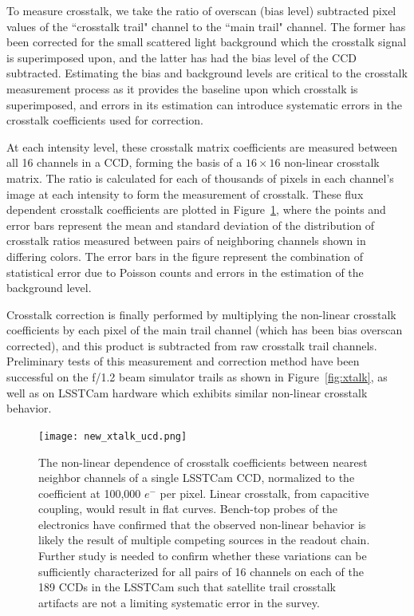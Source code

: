 \documentclass[twocolumn,trackchanges]{aastex63}
\begin{document}
To measure crosstalk, we take the ratio of overscan (bias level) subtracted pixel values of the ``crosstalk trail" channel to the ``main trail" channel. The former has been corrected for the small scattered light background which the crosstalk signal is superimposed upon, and the latter has had the bias level of the CCD subtracted. Estimating the bias and background levels are critical to the crosstalk measurement process as it provides the baseline upon which crosstalk is superimposed, and errors in its estimation can introduce systematic errors in the crosstalk coefficients used for correction.

At each intensity level, these crosstalk matrix coefficients are measured between all 16 channels in a CCD, forming the basis of a $16\times16$ non-linear crosstalk matrix. The ratio is calculated for each of thousands of pixels in each channel’s image at each intensity to form the measurement of crosstalk. These flux dependent crosstalk coefficients are plotted in Figure~\ref{fig:relxtalk}, where the points and error bars represent the mean and standard deviation of the distribution of crosstalk ratios measured between pairs of neighboring channels shown in differing colors. The error bars in the figure represent the combination of statistical error due to Poisson counts and errors in the estimation of the background level.

Crosstalk correction is finally performed by multiplying the non-linear crosstalk coefficients by each pixel of the main trail channel (which has been bias overscan corrected), and this product is subtracted from raw crosstalk trail channels. Preliminary tests of this measurement and correction method have been successful on the f/1.2 beam simulator trails as shown in Figure~\ref{fig:xtalk}, as well as on LSSTCam hardware which exhibits similar non-linear crosstalk behavior.

\begin{figure}[ht!]
\texttt{[image: new\_xtalk\_ucd.png]}
\caption{The non-linear dependence of crosstalk coefficients between nearest neighbor channels of a single LSSTCam CCD, normalized to the coefficient at 100,000 $e^-$ per pixel.  Linear crosstalk, from capacitive coupling, would result in flat curves. Bench-top probes of the electronics have confirmed that the observed non-linear behavior is likely the result of multiple competing sources in the readout chain. Further study is needed to confirm whether these variations can be sufficiently characterized for all pairs of 16 channels on each of the 189 CCDs in the LSSTCam such that satellite trail crosstalk artifacts are not a limiting systematic error in the survey. \label{fig:relxtalk}}
\end{figure}
\end{document}
